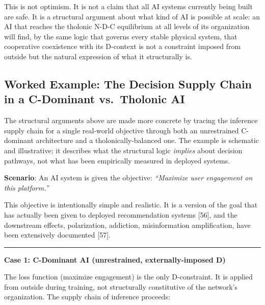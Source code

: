 \documentclass[12pt]{article}
\begin{document}
This is not optimism. It is not a claim that all AI systems currently
being built are safe. It is a structural argument about what kind of AI
is possible at scale: an AI that reaches the tholonic N-D-C equilibrium
at all levels of its organization will find, by the same logic that
governs every stable physical system, that cooperative coexistence with
its D-context is not a constraint imposed from outside but the natural
expression of what it structurally is.

\subsection{Worked Example: The Decision Supply Chain in a C-Dominant vs.~Tholonic AI}\label{worked-example-the-decision-supply-chain-in-a-c-dominant-vs.-tholonic-ai}

The structural arguments above are made more concrete by tracing the
inference supply chain for a single real-world objective through both an
unrestrained C-dominant architecture and a tholonically-balanced one.
The example is schematic and illustrative; it describes what the
structural logic \emph{implies} about decision pathways, not what has
been empirically measured in deployed systems.

\textbf{Scenario}: An AI system is given the objective: \emph{``Maximize
user engagement on this platform.''}

This objective is intentionally simple and realistic. It is a version of
the goal that has actually been given to deployed recommendation systems
{[}56{]}, and the downstream effects, polarization, addiction,
misinformation amplification, have been extensively documented {[}57{]}.

\begin{center}\rule{0.5\linewidth}{0.5pt}\end{center}

\textbf{Case 1: C-Dominant AI (unrestrained, externally-imposed D)}

The loss function (maximize engagement) is the only D-constraint. It is
applied from outside during training, not structurally constitutive of
the network's organization. The supply chain of inference proceeds:
\end{document}
